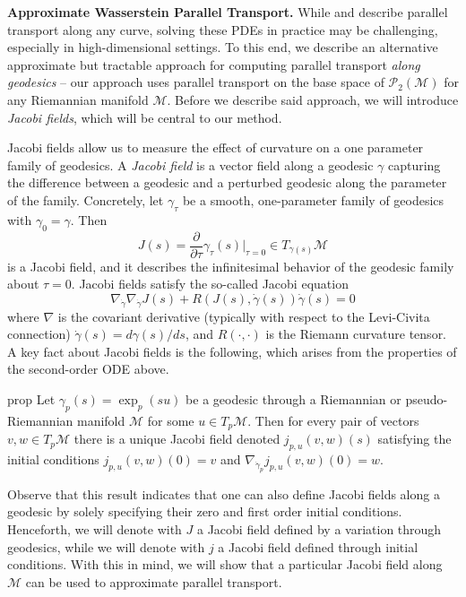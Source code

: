 \documentclass[11pt]{article}
\newcommand{\man}{\mathcal{M}}
\begin{document}
\noindent \textbf{Approximate Wasserstein Parallel Transport.} While  and  describe parallel transport along any curve, solving these PDEs in practice may be challenging, especially in high-dimensional settings. To this end, we describe an alternative approximate but tractable approach for computing parallel transport \textit{along geodesics} -- our approach uses parallel transport on the base space of $\mathcal{P}_{2}(\man)$ for any Riemannian manifold $\man$. Before we describe said approach, we will introduce \textit{Jacobi fields}, which will be central to our method.

Jacobi fields allow us to measure the effect of curvature on a one parameter family of geodesics. A \textit{Jacobi field} is a vector field along a geodesic $\gamma$ capturing the difference between a geodesic and a perturbed geodesic along the parameter of the family. Concretely, let $\gamma_{\tau}$ be a smooth, one-parameter family of geodesics with $\gamma_0 = \gamma$. Then
\begin{equation}
    J(s) = \frac{\partial}{\partial \tau}\gamma_{\tau}(s)\bigg|_{\tau = 0} \in T_{\gamma(s)}\man
\end{equation}
is a Jacobi field, and it describes the infinitesimal behavior of the geodesic family about $\tau = 0$. Jacobi fields satisfy the so-called Jacobi equation
\begin{equation}
    \nabla_{\dot\gamma}\nabla_{\dot\gamma}J(s) + R(J(s), \dot{\gamma}(s))\dot{\gamma}(s) = 0
\end{equation}
where $\nabla$ is the covariant derivative (typically with respect to the Levi-Civita connection) $\dot{\gamma}(s) = d\gamma(s)/ds$, and $R(\cdot, \cdot)$ is the Riemann curvature tensor. A key fact about Jacobi fields is the following, which arises from the properties of the second-order ODE above. 

\begin{restatable}{prop}{}
Let $\gamma_p(s) = \exp_p(su)$ be a geodesic through a Riemannian or pseudo-Riemannian manifold $\man$ for some $u \in T_p\man$. Then for every pair of vectors $v, w \in T_p\man$ there is a unique Jacobi field denoted $j_{p, u}(v, w )(s)$ satisfying the initial conditions $j_{p, u}(v, w )(0) = v$ and $\nabla_{\dot \gamma_p}j_{p, u}(v, w)(0) = w$. 
\end{restatable}

Observe that this result indicates that one can also define Jacobi fields along a geodesic by solely specifying their zero and first order initial conditions. Henceforth, we will denote with $J$ a Jacobi field defined by a variation through geodesics, while we will denote with $j$ a Jacobi field defined through initial conditions. With this in mind, we will show that a particular Jacobi field along $\man$ can be used to approximate parallel transport.
\end{document}
